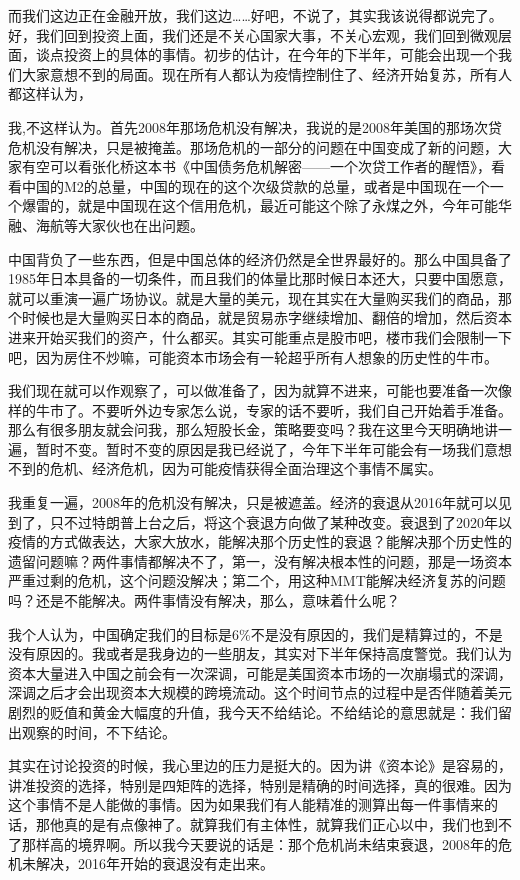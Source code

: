 \documentclass[UTF8, 12pt, a4paper]{ctexrep}
\begin{document}
而我们这边正在金融开放，我们这边……好吧，不说了，其实我该说得都说完了。好，我们回到投资上面，我们还是不关心国家大事，不关心宏观，我们回到微观层面，谈点投资上的具体的事情。初步的估计，在今年的下半年，可能会出现一个我们大家意想不到的局面。现在所有人都认为疫情控制住了、经济开始复苏，所有人都这样认为，

我,不这样认为。首先2008年那场危机没有解决，我说的是2008年美国的那场次贷危机没有解决，只是被掩盖。那场危机的一部分的问题在中国变成了新的问题，大家有空可以看张化桥这本书《中国债务危机解密——一个次贷工作者的醒悟》，看看中国的M2的总量，中国的现在的这个次级贷款的总量，或者是中国现在一个一个爆雷的，就是中国现在这个信用危机，最近可能这个除了永煤之外，今年可能华融、海航等大家伙也在出问题。

中国背负了一些东西，但是中国总体的经济仍然是全世界最好的。那么中国具备了1985年日本具备的一切条件，而且我们的体量比那时候日本还大，只要中国愿意，就可以重演一遍广场协议。就是大量的美元，现在其实在大量购买我们的商品，那个时候也是大量购买日本的商品，就是贸易赤字继续增加、翻倍的增加，然后资本进来开始买我们的资产，什么都买。其实可能重点是股市吧，楼市我们会限制一下吧，因为房住不炒嘛，可能资本市场会有一轮超乎所有人想象的历史性的牛市。

我们现在就可以作观察了，可以做准备了，因为就算不进来，可能也要准备一次像样的牛市了。不要听外边专家怎么说，专家的话不要听，我们自己开始着手准备。那么有很多朋友就会问我，那么短股长金，策略要变吗？我在这里今天明确地讲一遍，暂时不变。暂时不变的原因是我已经说了，今年下半年可能会有一场我们意想不到的危机、经济危机，因为可能疫情获得全面治理这个事情不属实。

我重复一遍，2008年的危机没有解决，只是被遮盖。经济的衰退从2016年就可以见到了，只不过特朗普上台之后，将这个衰退方向做了某种改变。衰退到了2020年以疫情的方式做表达，大家大放水，能解决那个历史性的衰退？能解决那个历史性的遗留问题嘛？两件事情都解决不了，第一，没有解决根本性的问题，那是一场资本严重过剩的危机，这个问题没解决；第二个，用这种MMT能解决经济复苏的问题吗？还是不能解决。两件事情没有解决，那么，意味着什么呢？

我个人认为，中国确定我们的目标是6\%不是没有原因的，我们是精算过的，不是没有原因的。我或者是我身边的一些朋友，其实对下半年保持高度警觉。我们认为资本大量进入中国之前会有一次深调，可能是美国资本市场的一次崩塌式的深调，深调之后才会出现资本大规模的跨境流动。这个时间节点的过程中是否伴随着美元剧烈的贬值和黄金大幅度的升值，我今天不给结论。不给结论的意思就是：我们留出观察的时间，不下结论。

其实在讨论投资的时候，我心里边的压力是挺大的。因为讲《资本论》是容易的，讲准投资的选择，特别是四矩阵的选择，特别是精确的时间选择，真的很难。因为这个事情不是人能做的事情。因为如果我们有人能精准的测算出每一件事情来的话，那他真的是有点像神了。就算我们有主体性，就算我们正心以中，我们也到不了那样高的境界啊。所以我今天要说的话是：那个危机尚未结束衰退，2008年的危机未解决，2016年开始的衰退没有走出来。
\end{document}
